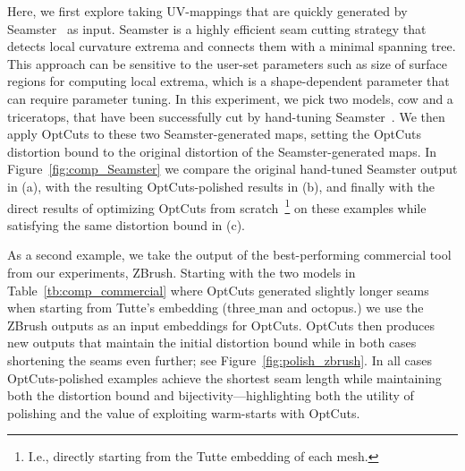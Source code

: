 Here, we first explore taking UV-mappings that are quickly generated by   Seamster~\cite{Sheffer2002Seamster} as input. Seamster is a highly efficient seam cutting strategy that detects local curvature extrema and connects them with a minimal spanning tree. This approach can be sensitive to the user-set parameters such as size of surface regions for computing local extrema, which is a shape-dependent parameter that can require parameter tuning. In this experiment, we pick two models, cow and a triceratops, that have been successfully cut by hand-tuning Seamster\ \cite{Sheffer2002Seamster}. We then apply OptCuts to these two Seamster-generated maps, setting the OptCuts distortion bound to the original distortion of the Seamster-generated maps. In Figure~\ref{fig:comp_Seamster} we compare the original hand-tuned Seamster output in (a), with the resulting OptCuts-polished results in (b), and finally with the direct results of optimizing OptCuts from scratch~\footnote{I.e., directly starting from the Tutte embedding of each mesh.} on these examples while satisfying the same distortion bound in (c). 

As a second example, we take the output of the best-performing commercial tool from our experiments, ZBrush. Starting with the two models in Table~\ref{tb:comp_commercial} where OptCuts generated slightly longer seams when starting from Tutte's embedding (three$\_$man and octopus.) we use the ZBrush outputs as an input embeddings for OptCuts. OptCuts then produces new outputs that maintain the initial distortion bound while in both cases shortening the seams even further; see Figure~\ref{fig:polish_zbrush}. In all cases OptCuts-polished examples achieve the shortest seam length while maintaining both the distortion bound and bijectivity---highlighting both the utility of polishing and the value of exploiting warm-starts with OptCuts.




